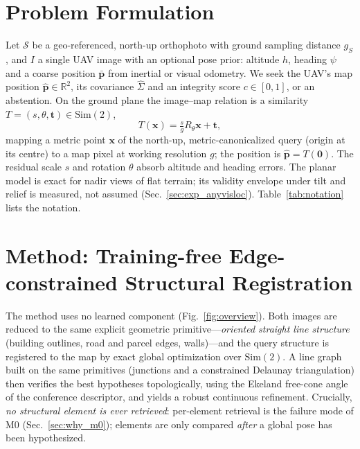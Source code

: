 \section{Problem Formulation}
\label{sec:problem}

Let $\mathcal{S}$ be a geo-referenced, north-up orthophoto with ground sampling
distance $g_S$, and $I$ a single UAV image with an optional pose prior:
altitude $h$, heading $\psi$ and a coarse position $\bar{\mathbf{p}}$ from
inertial or visual odometry. We seek the UAV's map position
$\hat{\mathbf{p}}\in\mathbb{R}^2$, its covariance $\hat\Sigma$ and an integrity
score $c\in[0,1]$, or an abstention. On the ground plane the image--map relation
is a similarity $T=(s,\theta,\mathbf t)\in\mathrm{Sim}(2)$,
\begin{equation}
  T(\mathbf x)=\tfrac{s}{g}R_\theta\mathbf x+\mathbf t,
  \label{eq:sim2}
\end{equation}
mapping a metric point $\mathbf x$ of the north-up, metric-canonicalized query
(origin at its centre) to a map pixel at working resolution $g$; the position
is $\hat{\mathbf p}=T(\mathbf 0)$. The residual scale $s$ and rotation $\theta$
absorb altitude and heading errors. The planar model is exact for nadir views
of flat terrain; its validity envelope under tilt and relief is measured, not
assumed (Sec.~\ref{sec:exp_anyvisloc}). Table~\ref{tab:notation} lists the notation.



\section{Method: Training-free Edge-constrained Structural Registration}
\label{sec:method}

The method uses no learned component (Fig.~\ref{fig:overview}). Both images are
reduced to the same explicit geometric primitive---\emph{oriented straight line
structure} (building outlines, road and parcel edges, walls)---and the query
structure is registered to the map by exact global optimization over
$\mathrm{Sim}(2)$. A line graph built on the same primitives (junctions and a
constrained Delaunay triangulation) then verifies the best hypotheses
topologically, using the Ekeland free-cone angle of the conference descriptor,
and yields a robust continuous refinement. Crucially, \emph{no structural
element is ever retrieved}: per-element retrieval is the failure mode of M0
(Sec.~\ref{sec:why_m0}); elements are only compared \emph{after} a global pose
has been hypothesized.

